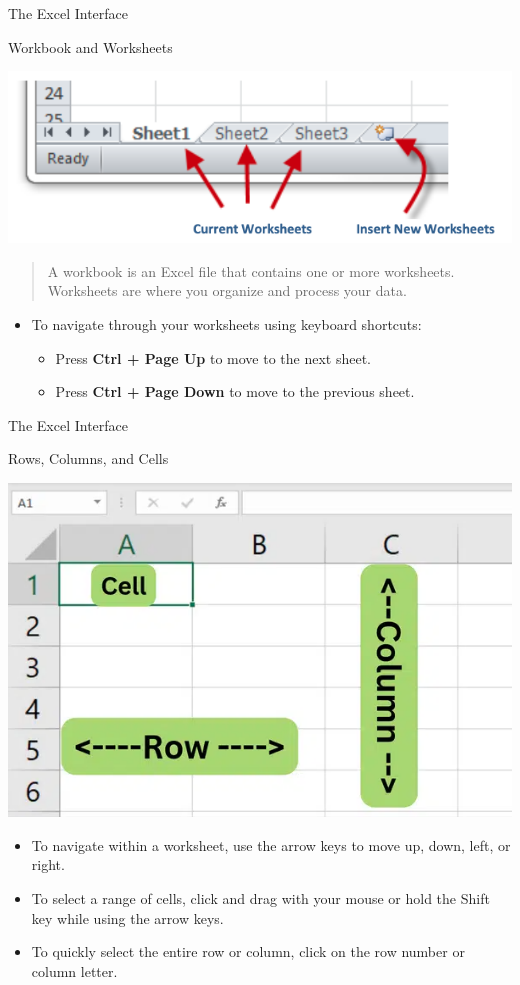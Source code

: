 \documentclass[
  10pt,
  ignorenonframetext,
]{beamer}
\begin{document}
\begin{frame}{The Excel Interface}
\protect\hypertarget{the-excel-interface-2}{}
\begin{block}{Workbook and Worksheets}
\protect\hypertarget{workbook-and-worksheets-1}{}
\begin{center}\includegraphics[width=0.5\linewidth]{pictures/Excel-worksheets} \end{center}

\begin{quote}
A workbook is an Excel file that contains one or more worksheets.
Worksheets are where you organize and process your data.
\end{quote}

\begin{itemize}
\item
  To navigate through your worksheets using keyboard shortcuts:

  \begin{itemize}
  \item
    Press \textbf{Ctrl + Page Up} to move to the next sheet.
  \item
    Press \textbf{Ctrl + Page Down} to move to the previous sheet.
  \end{itemize}
\end{itemize}
\end{block}
\end{frame}

\begin{frame}{The Excel Interface}
\protect\hypertarget{the-excel-interface-3}{}
\begin{block}{Rows, Columns, and Cells}
\protect\hypertarget{rows-columns-and-cells-1}{}
\begin{center}\includegraphics[width=0.5\linewidth]{pictures/Excel-cells} \end{center}

\begin{itemize}
\item
  To navigate within a worksheet, use the arrow keys to move up, down,
  left, or right.
\item
  To select a range of cells, click and drag with your mouse or hold the
  Shift key while using the arrow keys.
\item
  To quickly select the entire row or column, click on the row number or
  column letter.
\end{itemize}
\end{block}
\end{frame}
\end{document}
